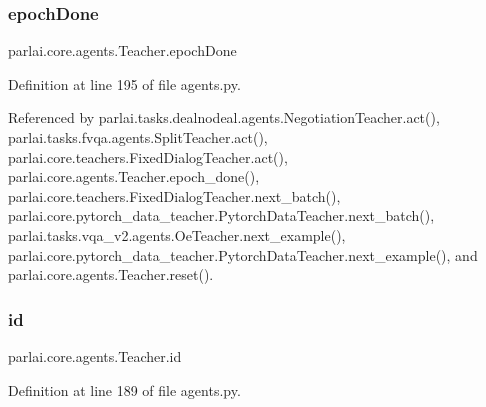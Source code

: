 \subsubsection{\texorpdfstring{epoch\+Done}{epochDone}}
{\footnotesize\ttfamily parlai.\+core.\+agents.\+Teacher.\+epoch\+Done}



Definition at line 195 of file agents.\+py.



Referenced by parlai.\+tasks.\+dealnodeal.\+agents.\+Negotiation\+Teacher.\+act(), parlai.\+tasks.\+fvqa.\+agents.\+Split\+Teacher.\+act(), parlai.\+core.\+teachers.\+Fixed\+Dialog\+Teacher.\+act(), parlai.\+core.\+agents.\+Teacher.\+epoch\+\_\+done(), parlai.\+core.\+teachers.\+Fixed\+Dialog\+Teacher.\+next\+\_\+batch(), parlai.\+core.\+pytorch\+\_\+data\+\_\+teacher.\+Pytorch\+Data\+Teacher.\+next\+\_\+batch(), parlai.\+tasks.\+vqa\+\_\+v2.\+agents.\+Oe\+Teacher.\+next\+\_\+example(), parlai.\+core.\+pytorch\+\_\+data\+\_\+teacher.\+Pytorch\+Data\+Teacher.\+next\+\_\+example(), and parlai.\+core.\+agents.\+Teacher.\+reset().

\mbox{\label{classparlai_1_1core_1_1agents_1_1Teacher_a8385159acf54471fee8887ba2a83b53c}} 
\subsubsection{\texorpdfstring{id}{id}}
{\footnotesize\ttfamily parlai.\+core.\+agents.\+Teacher.\+id}



Definition at line 189 of file agents.\+py.



